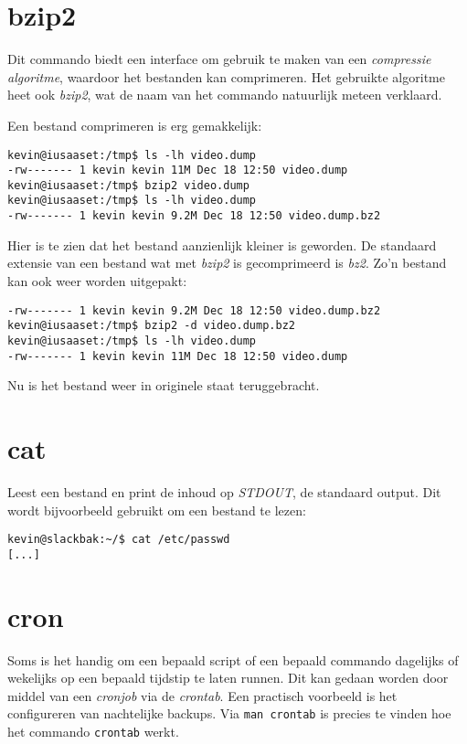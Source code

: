 \section{bzip2}
Dit commando biedt een interface om gebruik te maken van een \emph{compressie algoritme}, waardoor het bestanden kan comprimeren. Het gebruikte algoritme heet ook \emph{bzip2}, wat de naam van het commando natuurlijk meteen verklaard. 

Een bestand comprimeren is erg gemakkelijk:
\begin{lstlisting}
kevin@iusaaset:/tmp$ ls -lh video.dump 
-rw------- 1 kevin kevin 11M Dec 18 12:50 video.dump
kevin@iusaaset:/tmp$ bzip2 video.dump 
kevin@iusaaset:/tmp$ ls -lh video.dump
-rw------- 1 kevin kevin 9.2M Dec 18 12:50 video.dump.bz2
\end{lstlisting}%

Hier is te zien dat het bestand aanzienlijk kleiner is geworden. De standaard extensie van een bestand wat met \emph{bzip2} is gecomprimeerd is \emph{bz2}. Zo'n bestand kan ook weer worden uitgepakt:
\begin{lstlisting}
-rw------- 1 kevin kevin 9.2M Dec 18 12:50 video.dump.bz2
kevin@iusaaset:/tmp$ bzip2 -d video.dump.bz2 
kevin@iusaaset:/tmp$ ls -lh video.dump 
-rw------- 1 kevin kevin 11M Dec 18 12:50 video.dump
\end{lstlisting}
Nu is het bestand weer in originele staat teruggebracht. 

\section{cat}
Leest een bestand en print de inhoud op \emph{STDOUT}, de standaard output. Dit wordt bijvoorbeeld gebruikt om een bestand te lezen: 
\begin{lstlisting}
kevin@slackbak:~/$ cat /etc/passwd
[...]
\end{lstlisting}%

\section{cron}
Soms is het handig om een bepaald script of een bepaald commando dagelijks of wekelijks op een bepaald tijdstip te laten runnen. Dit kan gedaan worden door middel van een \emph{cronjob} via de \emph{crontab}. Een practisch voorbeeld is het configureren van nachtelijke backups. Via \texttt{man crontab} is precies te vinden hoe het commando \texttt{crontab} werkt. 

